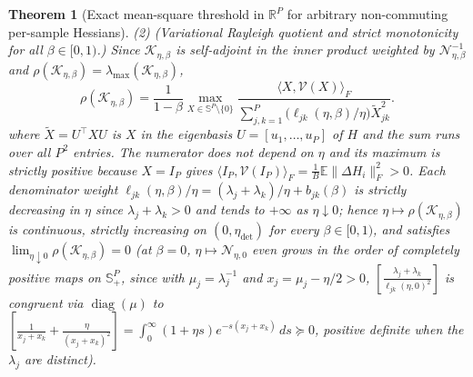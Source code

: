 \documentclass[11pt]{article}
\newtheorem{theorem}{Theorem}
\theoremstyle{remark}
\newcommand{\E}{\mathbb{E}}
\newcommand{\R}{\mathbb{R}}
\begin{document}
\begin{theorem}[Exact mean-square threshold in $\R^P$ for arbitrary non-commuting per-sample Hessians]
(2) \emph{(Variational Rayleigh quotient and strict monotonicity for all $\beta\in[0,1)$.)} Since $\mathcal K_{\eta,\beta}$ is self-adjoint in the inner product weighted by $\mathcal N_{\eta,\beta}^{-1}$ and $\rho(\mathcal K_{\eta,\beta})=\lambda_{\max}(\mathcal K_{\eta,\beta})$,
\[
\rho(\mathcal K_{\eta,\beta})
=\frac{1}{1-\beta}\max_{X\in\mathbb S^P\setminus\{0\}}\frac{\langle X,\mathcal V(X)\rangle_F}{\sum_{j,k=1}^P\big(\ell_{jk}(\eta,\beta)/\eta\big)\widetilde X_{jk}^2}.
\] where $\widetilde X=U^\top XU$ is $X$ in the eigenbasis $U=[u_1,\dots,u_P]$ of $H$ and the sum runs over all $P^2$ entries.
The numerator does not depend on $\eta$ and its maximum is strictly positive because $X=I_P$ gives $\langle I_P,\mathcal V(I_P)\rangle_F=\frac1B\E\|\Delta H_i\|_F^2>0$. Each denominator weight $\ell_{jk}(\eta,\beta)/\eta=(\lambda_j+\lambda_k)/\eta+b_{jk}(\beta)$ is strictly decreasing in $\eta$ since $\lambda_j+\lambda_k>0$ and tends to $+\infty$ as $\eta\downarrow0$; hence $\eta\mapsto\rho(\mathcal K_{\eta,\beta})$ is continuous, strictly increasing on $(0,\eta_{\mathrm{det}})$ for every $\beta\in[0,1)$, and satisfies $\lim_{\eta\downarrow0}\rho(\mathcal K_{\eta,\beta})=0$ (at $\beta=0$, $\eta\mapsto\mathcal N_{\eta,0}$ even grows in the order of completely positive maps on $\mathbb S_+^P$, since with $\mu_j=\lambda_j^{-1}$ and $x_j=\mu_j-\eta/2>0$, $[\frac{\lambda_j+\lambda_k}{\ell_{jk}(\eta,0)^2}]$ is congruent via $\operatorname{diag}(\mu)$ to $[\frac1{x_j+x_k}+\frac\eta{(x_j+x_k)^2}]=\int_0^\infty(1+\eta s)e^{-s(x_j+x_k)}\,ds\succeq0$, positive definite when the $\lambda_j$ are distinct).

\end{theorem}
\end{document}
